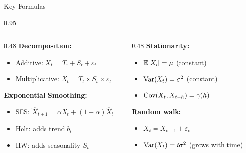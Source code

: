 \documentclass[9pt, aspectratio=169, t]{beamer}
\begin{document}
\begin{frame}{Key Formulas}
    \begin{cminipage}{0.95\textwidth}
    \begin{columns}[T]
        \begin{column}{0.48\textwidth}
            \textbf{Decomposition:}
            \begin{itemize}\setlength{\itemsep}{0pt}
                \item Additive: $X_t = T_t + S_t + \varepsilon_t$
                \item Multiplicative: $X_t = T_t \times S_t \times \varepsilon_t$
            \end{itemize}

            \vspace{0.3cm}

            \textbf{Exponential Smoothing:}
            \begin{itemize}\setlength{\itemsep}{0pt}
                \item SES: $\hat{X}_{t+1} = \alpha X_t + (1-\alpha)\hat{X}_t$
                \item Holt: adds trend $b_t$
                \item HW: adds seasonality $S_t$
            \end{itemize}
        \end{column}
        \begin{column}{0.48\textwidth}
            \textbf{Stationarity:}
            \begin{itemize}\setlength{\itemsep}{0pt}
                \item $\mathbb{E}[X_t] = \mu$ (constant)
                \item $\text{Var}(X_t) = \sigma^2$ (constant)
                \item $\text{Cov}(X_t, X_{t+h}) = \gamma(h)$
            \end{itemize}

            \vspace{0.3cm}

            \textbf{Random walk:}
            \begin{itemize}\setlength{\itemsep}{0pt}
                \item $X_t = X_{t-1} + \varepsilon_t$
                \item $\text{Var}(X_t) = t\sigma^2$ (grows with time)
            \end{itemize}
        \end{column}
    \end{columns}
    \end{cminipage}
\end{frame}
\end{document}
